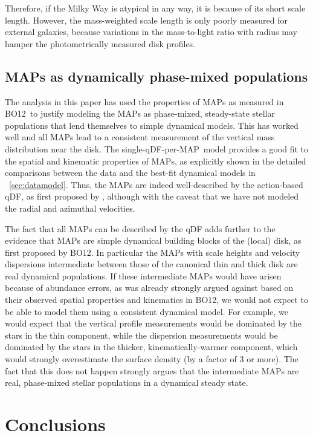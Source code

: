 \documentclass{emulateapj}
\newcommand{\map}{MAP}
\newcommand{\bo}{BO12}
\begin{document}
Therefore, if the Milky Way is atypical in any way, it is because of
its short scale length. However, the mass-weighted scale length is
only poorly measured for external galaxies, because variations in the
mass-to-light ratio with radius may hamper the photometrically
measured disk profiles.


\subsection{\map s as dynamically phase-mixed populations}

The analysis in this paper has used the properties of \map s as
measured in \bo\ to justify modeling the \map s as phase-mixed,
steady-state stellar populations that lend themselves to simple
dynamical models. This has worked well and all \map s lead to a
consistent measurement of the vertical mass distribution near the
disk. The single-qDF-per-\map\ model provides a good fit to the
spatial and kinematic properties of \map s, as explicitly shown in the
detailed comparisons between the data and the best-fit dynamical
models in \appendixname~\ref{sec:datamodel}. Thus, the \map s are
indeed well-described by the action-based qDF, as first proposed by
\citet{Ting13a}, although with the caveat that we have not modeled the
radial and azimuthal velocities.

The fact that all \map s can be described by the qDF adds further to
the evidence that \map s are simple dynamical building blocks of the
(local) disk, as first proposed by \bo. In particular the \map s with
scale heights and velocity dispersions intermediate between those of
the canonical thin and thick disk are real dynamical populations. If
these intermediate \map s would have arisen because of abundance
errors, as was already strongly argued against based on their observed
spatial properties and kinematics in \bo, we would not expect to be
able to model them using a consistent dynamical model. For example, we
would expect that the vertical profile measurements would be dominated
by the stars in the thin component, while the dispersion measurements
would be dominated by the stars in the thicker, kinematically-warmer
component, which would strongly overestimate the surface density (by a
factor of 3 or more). The fact that this does not happen strongly
argues that the intermediate \map s are real, phase-mixed stellar
populations in a dynamical steady state.

\section{Conclusions}\label{sec:conclusion}
\end{document}

